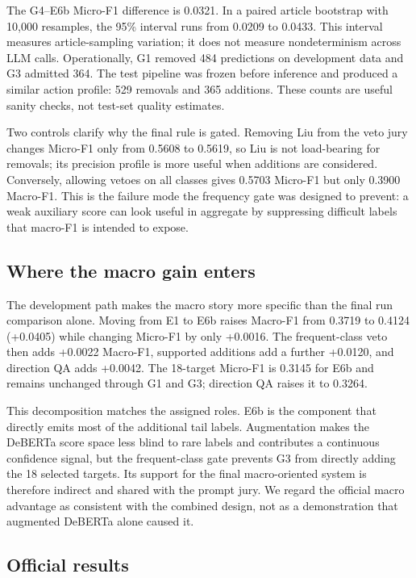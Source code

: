 \documentclass[sigconf,article,a4paper]{acmart}
\begin{document}
The G4--E6b Micro-F1 difference is 0.0321. In a paired article bootstrap with
10,000 resamples, the 95\% interval runs from 0.0209 to 0.0433. This interval
measures article-sampling variation; it does not measure nondeterminism across
LLM calls. Operationally, G1 removed 484 predictions on development data and
G3 admitted 364. The test pipeline was frozen before inference and produced a
similar action profile: 529 removals and 365 additions. These counts are useful
sanity checks, not test-set quality estimates.

Two controls clarify why the final rule is gated. Removing Liu from the veto
jury changes Micro-F1 only from 0.5608 to 0.5619, so Liu is not load-bearing
for removals; its precision profile is more useful when additions are
considered. Conversely, allowing vetoes on all classes gives 0.5703 Micro-F1
but only 0.3900 Macro-F1. This is the failure mode the frequency gate was
designed to prevent: a weak auxiliary score can look useful in aggregate by
suppressing difficult labels that macro-F1 is intended to expose.

\subsection{Where the macro gain enters}

The development path makes the macro story more specific than the final run
comparison alone. Moving from E1 to E6b raises Macro-F1 from 0.3719 to 0.4124
(+0.0405) while changing Micro-F1 by only +0.0016. The frequent-class veto
then adds +0.0022 Macro-F1, supported additions add a further +0.0120, and
direction QA adds +0.0042. The 18-target Micro-F1 is 0.3145 for E6b and remains
unchanged through G1 and G3; direction QA raises it to 0.3264.

This decomposition matches the assigned roles. E6b is the component that
directly emits most of the additional tail labels. Augmentation makes the
DeBERTa score space less blind to rare labels and contributes a continuous
confidence signal, but the frequent-class gate prevents G3 from directly
adding the 18 selected targets. Its support for the final macro-oriented system
is therefore indirect and shared with the prompt jury. We regard the official
macro advantage as consistent with the combined design, not as a demonstration
that augmented DeBERTa alone caused it.

\subsection{Official results}
\end{document}

